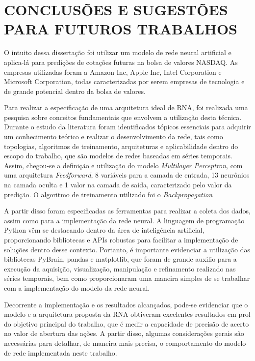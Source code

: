 
\chapter{CONCLUSÕES E SUGESTÕES PARA FUTUROS TRABALHOS}\label{ch:conclusao}
O intuito dessa dissertação foi utilizar um modelo de rede neural artificial e aplica-lá para predições de cotações futuras na bolsa de valores NASDAQ. As empresas utilizadas foram a Amazon Inc, Apple Inc, Intel Corporation e Microsoft Corporation, todas caracterizadas por serem empresas de tecnologia e de grande potencial dentro da bolsa de valores.

Para realizar a especificação de uma arquitetura ideal de RNA, foi realizada uma pesquisa sobre conceitos fundamentais que envolvem a utilização desta técnica. Durante o estudo da literatura foram identificados tópicos essenciais para adquirir um conhecimento teórico e realizar o desenvolvimento da rede, tais como topologias, algoritmos de treinamento, arquiteturas e aplicabilidade dentro do escopo do trabalho, que são modelos de redes baseadas em séries temporais. Assim, chegou-se a definição e utilização do modelo \textit{Multilayer Perceptron}, com uma arquitetura \textit{Feedforward}, 8 variáveis para a camada de entrada, 13 neurônios na camada oculta e 1 valor na camada de saída, caracterizado pelo valor da predição. O algoritmo de treinamento utilizado foi o \textit{Backpropagation} 

A partir disso foram especificadas as ferramentas para realizar a coleta dos dados, assim como para a implementação da rede neural. A linguagem de programação Python vêm se destacando dentro da área de inteligência artificial, proporcionando bibliotecas e APIs robustas para facilitar a implementação de soluções dentro desse contexto. Portanto, é importante evidenciar a utilização das bibliotecas PyBrain, pandas e matplotlib, que foram de grande auxilio para a execução da aquisição, visualização, manipulação e refinamento realizado nas séries temporais, bem como proporcionaram uma maneira simples de se trabalhar com a implementação do modelo da rede neural.

Decorrente a implementação e os resultados alcançados, pode-se evidenciar que o modelo e a arquitetura proposta da RNA obtiveram excelentes resultados em prol do objetivo principal do trabalho, que é medir a capacidade de precisão de acerto no valor de abertura das ações. A partir disso, algumas considerações gerais são necessárias para detalhar, de maneira mais precisa, o comportamento do modelo de rede implementada neste trabalho.

